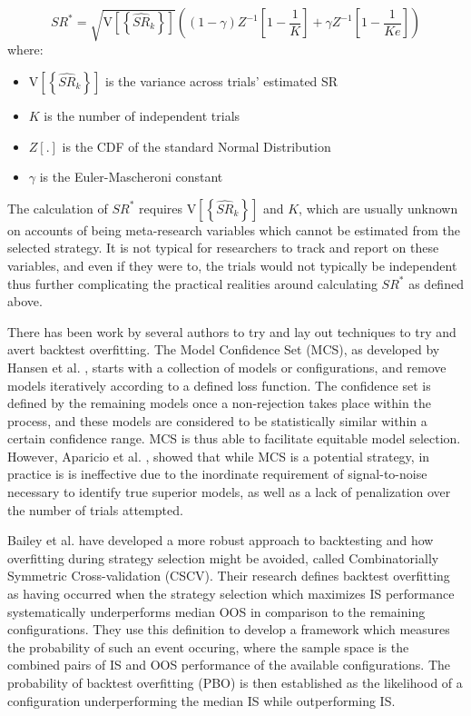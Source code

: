 \documentclass[a4paper,11pt,oneside]{article}
\theoremstyle{plain}
\theoremstyle{definition}
\begin{document}
\begin{equation}
SR^{*}=\sqrt{\mathrm{V}\left[\left\{\widehat{S R}_{k}\right\}\right]}\left((1-\gamma) Z^{-1}\left[1-\frac{1}{K}\right]+\gamma Z^{-1}\left[1-\frac{1}{K e}\right]\right)
\end{equation}
where:
\begin{itemize}
	\item [] $\mathrm{V}\left[\left\{\widehat{S R}_{k}\right\}\right]$ is the variance across trials' estimated SR
	\item [] $K$ is the number of independent trials
	\item [] $Z[.]$ is the CDF of the standard Normal Distribution 
	\item [] $\gamma$ is the Euler-Mascheroni constant
\end{itemize}

The calculation of $SR^*$ requires $\mathrm{V}\left[\left\{\widehat{S R}_{k}\right\}\right]$ and  $K$, which are usually unknown on accounts of being meta-research variables which cannot be estimated from the selected strategy. It is not typical for researchers to track and report on these variables, and even if they were to, the trials would not typically be independent thus further complicating the practical realities around calculating $SR^*$ as defined above. 


There has been work by several authors to try and lay out techniques to try and avert backtest overfitting. 
The Model Confidence Set (MCS), as developed by Hansen et al. \cite{Hansen}, starts with a 
collection of models or configurations, and remove models iteratively according to a defined loss function. 
The confidence set is defined by the remaining models once a non-rejection takes place within the process, and 
these models are considered to be statistically similar within a certain confidence range. MCS is thus able to facilitate 
equitable model selection. However, Aparicio et al. \cite{Aparicio}, showed  that while MCS is a potential strategy, in 
practice is is ineffective due to the inordinate requirement of signal-to-noise necessary to identify true superior 
models, as well as a lack of penalization over the number of trials attempted.
\hfill \break

Bailey et al. \cite{BailyPBO} have developed a more robust approach to backtesting and how overfitting during strategy 
selection might be avoided, called Combinatorially Symmetric Cross-validation (CSCV). Their research defines backtest overfitting as having occurred when the strategy selection which maximizes IS performance systematically underperforms median OOS in comparison to the remaining configurations. They use this definition to develop a framework which measures the probability of such an event occuring, where the sample space is the combined pairs of IS and OOS performance of the available configurations. The probability of backtest overfitting (PBO) is then established as the likelihood of a configuration underperforming the median IS while outperforming IS. 
\hfill \break 
\end{document}
